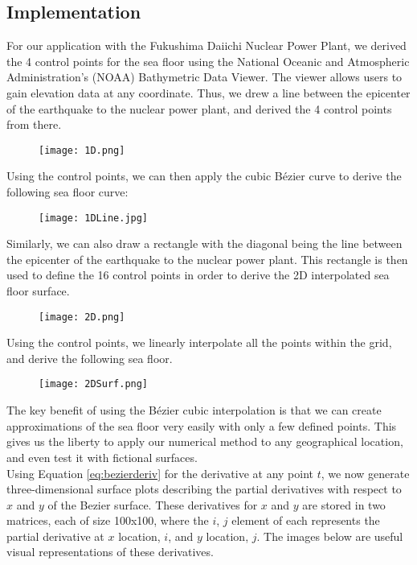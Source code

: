 \documentclass[../main.tex]{subfiles}
\begin{document}
\subsection{Implementation}
For our application with the Fukushima Daiichi Nuclear Power Plant, we derived the 4 control points for the sea floor using the National Oceanic and Atmospheric Administration's (NOAA) Bathymetric Data Viewer.  The viewer allows users to gain elevation data at any coordinate.  Thus, we drew a line between the epicenter of the earthquake to the nuclear power plant, and derived the 4 control points from there.
\begin{figure}[H]
\centering
\texttt{[image: 1D.png]}
\end{figure}
\noindent Using the control points, we can then apply the cubic B\'ezier curve to derive the following sea floor curve:
\begin{figure}[H]
\centering
\texttt{[image: 1DLine.jpg]}
\label{1DLine}
\end{figure}
\noindent Similarly, we can also draw a rectangle with the diagonal being the line between the epicenter of the earthquake to the nuclear power plant.  This rectangle is then used to define the 16 control points in order to derive the 2D interpolated sea floor surface.
\begin{figure}[H]
\centering
\texttt{[image: 2D.png]}
\end{figure}
\noindent Using the control points, we linearly interpolate all the points within the grid, and derive the following sea floor.
\begin{figure}[H]
\centering
\texttt{[image: 2DSurf.png]}
\end{figure}

\noindent The key benefit of using the B\'ezier cubic interpolation is that we can create approximations of the sea floor very easily with only a few defined points.  This gives us the liberty to apply our numerical method to any geographical location, and even test it with fictional surfaces. \\


\noindent Using Equation \ref{eq:bezierderiv} for the derivative at any point $t$, we now generate three-dimensional surface plots describing the partial derivatives with respect to $x$ and $y$ of the Bezier surface. These derivatives for $x$ and $y$ are stored in two matrices, each of size 100x100, where the $i$, $j$ element of each represents the partial derivative at $x$ location, $i$, and $y$ location, $j$. The images below are useful visual representations of these derivatives.
\end{document}
